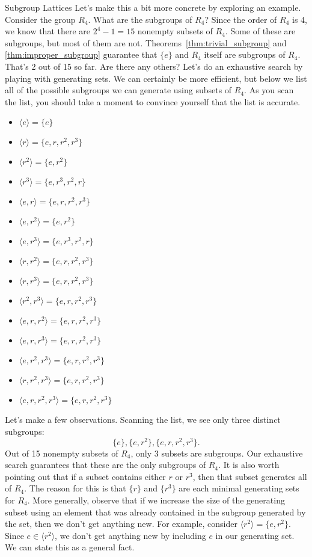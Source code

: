 \begin{section}{Subgroup Lattices}
Let's make this a bit more concrete by exploring an example.  Consider the group $R_4$.  What are the subgroups of $R_4$?  Since the order of $R_4$ is 4, we know that there are $2^4-1=15$ nonempty subsets of $R_4$.  Some of these are subgroups, but most of them are not.  Theorems~\ref{thm:trivial_subgroup} and \ref{thm:improper_subgroup} guarantee that $\{e\}$ and $R_4$ itself are subgroups of $R_4$.  That's 2 out of 15 so far.  Are there any others? Let's do an exhaustive search by playing with generating sets.  We can certainly be more efficient, but below we list all of the possible subgroups we can generate using subsets of $R_4$.  As you scan the list, you should take a moment to convince yourself that the list is accurate.
\begin{multicols}{2}
\begin{itemize}
\item[] $\langle e \rangle = \{e\}$
\item[] $\langle r \rangle  = \{e,r,r^2,r^3\}$
\item[] $\langle r^2 \rangle  = \{e,r^2\}$
\item[] $\langle r^3 \rangle  = \{e,r^3,r^2,r\}$
\item[] $\langle e,r \rangle  = \{e,r,r^2,r^3\}$
\item[] $\langle e,r^2 \rangle  = \{e,r^2\}$
\item[] $\langle e,r^3 \rangle  = \{e,r^3,r^2,r\}$
\item[] $\langle r,r^2 \rangle  = \{e,r,r^2,r^3\}$
\item[] $\langle r,r^3 \rangle  = \{e,r,r^2,r^3\}$
\item[] $\langle r^2,r^3 \rangle  = \{e,r,r^2,r^3\}$
\item[] $\langle e,r,r^2 \rangle  = \{e,r,r^2,r^3\}$
\item[] $\langle e,r,r^3 \rangle  = \{e,r,r^2,r^3\}$
\item[] $\langle e,r^2,r^3 \rangle  = \{e,r,r^2,r^3\}$
\item[] $\langle r,r^2,r^3 \rangle  = \{e,r,r^2,r^3\}$
\item[] $\langle e,r,r^2,r^3 \rangle = \{e,r,r^2,r^3\}$
\end{itemize}
\end{multicols}
\noindent Let's make a few observations.  Scanning the list, we see only three distinct subgroups:
\[
\{e\}, \{e,r^2\},\{e,r,r^2,r^3\}.
\]
Out of 15 nonempty subsets of $R_4$, only 3 subsets are subgroups. Our exhaustive search guarantees that these are the only subgroups of $R_4$.  It is also worth pointing out that if a subset contains either $r$ or $r^3$, then that subset generates all of $R_4$.  The reason for this is that $\{r\}$ and $\{r^3\}$ are each minimal generating sets for $R_4$. More generally, observe that if we increase the size of the generating subset using an element that was already contained in the subgroup generated by the set, then we don't get anything new.  For example, consider $\langle r^2\rangle=\{e,r^2\}$.  Since $e\in\langle r^2\rangle$, we don't get anything new by including $e$ in our generating set.  We can state this as a general fact.


\end{section}
